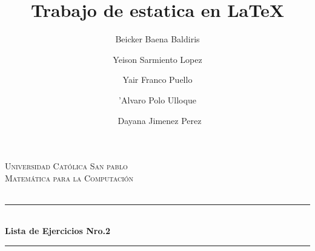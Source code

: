 \documentclass[12pt]{article}
\begin{document}
 
 

\title{Trabajo de estatica en \LaTeX}

\author{Beicker Baena Baldiris \and Yeison Sarmiento Lopez \and Yair Franco Puello \and 'Alvaro Polo Ulloque\and\ Dayana Jimenez Perez} 

\begin{titlepage}

\newcommand{\HRule}{\rule{\linewidth}{0.5mm}} %

\center %
 

\textsc{\LARGE Universidad Cat\'olica San pablo}\\[1.5cm] %
\textsc{\Large Matem\'atica para la Computaci\'on}\\[0.5cm] %
\textsc{\large }\\[0.5cm] %


\HRule \\[0.4cm]
{ \huge \bfseries Lista de Ejercicios Nro.2 }\\[0.4cm] %
\HRule \\[1.5cm]
 


\end{titlepage}
\end{document}
